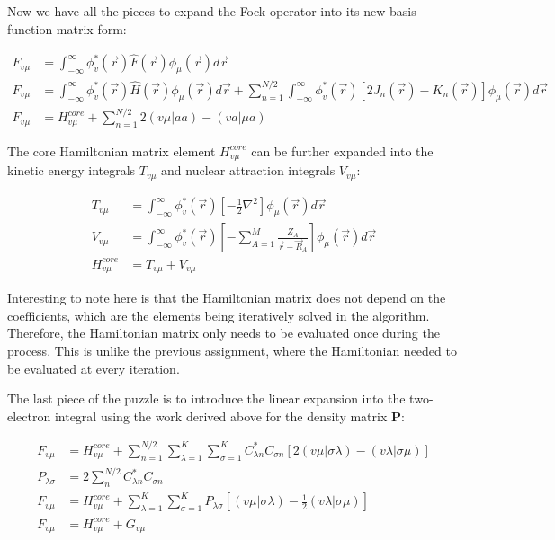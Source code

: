 \documentclass[10pt, oneside, letterpaper]{article}
\begin{document}
Now we have all the pieces to expand the Fock operator into its new basis function matrix form:

\begin{align*}
  F_{v\mu} &= \int_{-\infty}^{\infty} \phi_v^\ast(\vec{r}) \hat{F}(\vec{r}) \phi_\mu(\vec{r})d\vec{r} \\
  F_{v\mu} &= \int_{-\infty}^{\infty} \phi_v^\ast(\vec{r}) \hat{H}(\vec{r}) \phi_\mu(\vec{r})d\vec{r} + \sum_{n=1}^{N/2} \int_{-\infty}^{\infty} \phi_v^\ast(\vec{r}) \left[2J_n(\vec{r}) - K_n(\vec{r})\right] \phi_\mu(\vec{r})d\vec{r} \\
  F_{v\mu} &= H_{v\mu}^{core} + \sum_{n=1}^{N/2} 2(v\mu|aa) - (va|\mu a)
\end{align*}

The core Hamiltonian matrix element $H_{v\mu}^{core}$ can be further expanded into the kinetic energy integrals $T_{v\mu}$ and nuclear attraction integrals $V_{v\mu}$:

\begin{align*}
  T_{v\mu} &= \int_{-\infty}^{\infty} \phi_v^\ast(\vec{r}) \left[ -\frac{1}{2}\nabla^2 \right] \phi_\mu(\vec{r})d\vec{r} \\
  V_{v\mu} &= \int_{-\infty}^{\infty} \phi_v^\ast(\vec{r}) \left[ -\sum_{A=1}^{M}\frac{Z_A}{\vec{r} - \vec{R}_A} \right] \phi_\mu(\vec{r})d\vec{r} \\
  H_{v\mu}^{core} &= T_{v\mu} + V_{v\mu}
\end{align*}

Interesting to note here is that the Hamiltonian matrix does not depend on the coefficients, which are the elements being iteratively solved in the algorithm. Therefore, the Hamiltonian matrix only needs to be evaluated once during the process. This is unlike the previous assignment, where the Hamiltonian needed to be evaluated at every iteration.

The last piece of the puzzle is to introduce the linear expansion into the two-electron integral using the work derived above for the density matrix $\bm{P}$:

\begin{align*}
  F_{v\mu} &= H_{v\mu}^{core} + \sum_{n=1}^{N/2} \sum_{\lambda = 1}^K\sum_{\sigma = 1}^K C_{\lambda n}^\ast C_{\sigma n} \left[ 2(v\mu|\sigma\lambda) - (v\lambda|\sigma\mu) \right] \\
  P_{\lambda\sigma} &= 2 \sum_{n}^{N/2} C_{\lambda n}^\ast C_{\sigma n} \\
  F_{v\mu} &= H_{v\mu}^{core} + \sum_{\lambda = 1}^K\sum_{\sigma = 1}^K P_{\lambda\sigma} \left[ (v\mu|\sigma\lambda) - \frac{1}{2}(v\lambda|\sigma\mu) \right] \\
  F_{v\mu} &= H_{v\mu}^{core} + G_{v\mu}
\end{align*}
\end{document}
